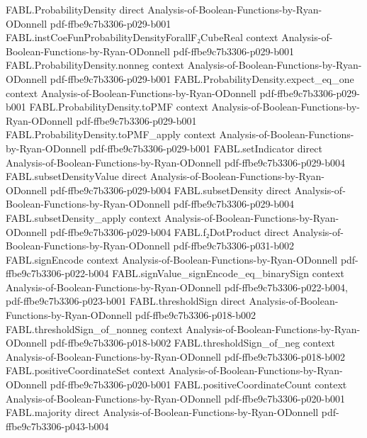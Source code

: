 \begin{theorem}
\proofstep
  {FABL.ProbabilityDensity}
  {direct}
  {Analysis-of-Boolean-Functions-by-Ryan-ODonnell}
  {pdf-ffbe9c7b3306-p029-b001}
\proofstep
  {FABL.instCoeFunProbabilityDensityForallF₂CubeReal}
  {context}
  {Analysis-of-Boolean-Functions-by-Ryan-ODonnell}
  {pdf-ffbe9c7b3306-p029-b001}
\proofstep
  {FABL.ProbabilityDensity.nonneg}
  {context}
  {Analysis-of-Boolean-Functions-by-Ryan-ODonnell}
  {pdf-ffbe9c7b3306-p029-b001}
\proofstep
  {FABL.ProbabilityDensity.expect_eq_one}
  {context}
  {Analysis-of-Boolean-Functions-by-Ryan-ODonnell}
  {pdf-ffbe9c7b3306-p029-b001}
\proofstep
  {FABL.ProbabilityDensity.toPMF}
  {context}
  {Analysis-of-Boolean-Functions-by-Ryan-ODonnell}
  {pdf-ffbe9c7b3306-p029-b001}
\proofstep
  {FABL.ProbabilityDensity.toPMF_apply}
  {context}
  {Analysis-of-Boolean-Functions-by-Ryan-ODonnell}
  {pdf-ffbe9c7b3306-p029-b001}
\proofstep
  {FABL.setIndicator}
  {direct}
  {Analysis-of-Boolean-Functions-by-Ryan-ODonnell}
  {pdf-ffbe9c7b3306-p029-b004}
\proofstep
  {FABL.subsetDensityValue}
  {direct}
  {Analysis-of-Boolean-Functions-by-Ryan-ODonnell}
  {pdf-ffbe9c7b3306-p029-b004}
\proofstep
  {FABL.subsetDensity}
  {direct}
  {Analysis-of-Boolean-Functions-by-Ryan-ODonnell}
  {pdf-ffbe9c7b3306-p029-b004}
\proofstep
  {FABL.subsetDensity_apply}
  {context}
  {Analysis-of-Boolean-Functions-by-Ryan-ODonnell}
  {pdf-ffbe9c7b3306-p029-b004}
\proofstep
  {FABL.f₂DotProduct}
  {direct}
  {Analysis-of-Boolean-Functions-by-Ryan-ODonnell}
  {pdf-ffbe9c7b3306-p031-b002}
\proofstep
  {FABL.signEncode}
  {context}
  {Analysis-of-Boolean-Functions-by-Ryan-ODonnell}
  {pdf-ffbe9c7b3306-p022-b004}
\proofstep
  {FABL.signValue_signEncode_eq_binarySign}
  {context}
  {Analysis-of-Boolean-Functions-by-Ryan-ODonnell}
  {pdf-ffbe9c7b3306-p022-b004,
    pdf-ffbe9c7b3306-p023-b001}
\proofstep
  {FABL.thresholdSign}
  {direct}
  {Analysis-of-Boolean-Functions-by-Ryan-ODonnell}
  {pdf-ffbe9c7b3306-p018-b002}
\proofstep
  {FABL.thresholdSign_of_nonneg}
  {context}
  {Analysis-of-Boolean-Functions-by-Ryan-ODonnell}
  {pdf-ffbe9c7b3306-p018-b002}
\proofstep
  {FABL.thresholdSign_of_neg}
  {context}
  {Analysis-of-Boolean-Functions-by-Ryan-ODonnell}
  {pdf-ffbe9c7b3306-p018-b002}
\proofstep
  {FABL.positiveCoordinateSet}
  {context}
  {Analysis-of-Boolean-Functions-by-Ryan-ODonnell}
  {pdf-ffbe9c7b3306-p020-b001}
\proofstep
  {FABL.positiveCoordinateCount}
  {context}
  {Analysis-of-Boolean-Functions-by-Ryan-ODonnell}
  {pdf-ffbe9c7b3306-p020-b001}
\proofstep
  {FABL.majority}
  {direct}
  {Analysis-of-Boolean-Functions-by-Ryan-ODonnell}
  {pdf-ffbe9c7b3306-p043-b004}

\end{theorem}
